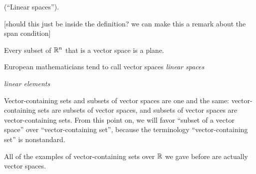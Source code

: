 \begin{theorem}
    (``Linear spaces'').
    
    [should this just be inside the definition? we can make this a remark about the span condition]
    
    Every subset of $\mathbb{R}^n$ that is a vector space is a plane.

    European mathematicians tend to call vector spaces \textit{linear spaces}

    \textit{linear elements}
\end{theorem}

\begin{remark}
    Vector-containing sets and subsets of vector spaces are one and the same: vector-containing sets are subsets of vector spaces, and subsets of vector spaces are vector-containing sets. From this point on, we will favor ``subset of a vector space'' over ``vector-containing set'', because the terminology ``vector-containing set'' is nonstandard.
\end{remark}

All of the examples of vector-containing sets over $\mathbb{R}$ we gave before are actually vector spaces.

